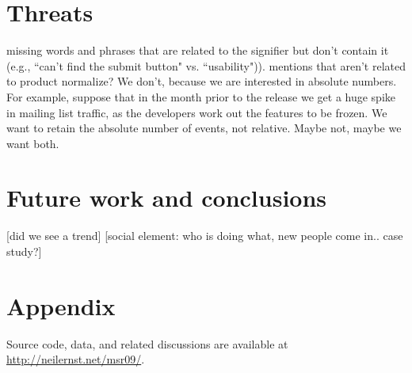 \documentclass[conference, compsoc]{IEEEtran}
\begin{document}
\section{Threats}
missing words and phrases that are related to the signifier but don't contain it (e.g., ``can't find the submit button" vs. ``usability")). 
mentions that aren't related to product
normalize? We don't, because we are interested in absolute numbers. For example, suppose that in the month prior to the release we get a huge spike in mailing list traffic, as the developers work out the features to be frozen. We want to retain the absolute number of events, not relative. Maybe not, maybe we want both.
\section{Future work and conclusions}
[did we see a trend]
[social element: who is doing what, new people come in.. case study?]
\section{Appendix}
Source code, data, and related discussions are available at \url{http://neilernst.net/msr09/}.
\begin{footnotesize}

\end{footnotesize}
\end{document}
